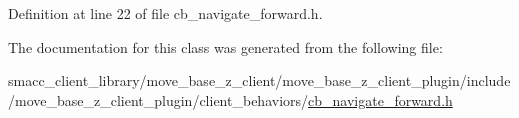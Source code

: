 Definition at line 22 of file cb\+\_\+navigate\+\_\+forward.\+h.



The documentation for this class was generated from the following file\+:\begin{DoxyCompactItemize}
\item 
smacc\+\_\+client\+\_\+library/move\+\_\+base\+\_\+z\+\_\+client/move\+\_\+base\+\_\+z\+\_\+client\+\_\+plugin/include/move\+\_\+base\+\_\+z\+\_\+client\+\_\+plugin/client\+\_\+behaviors/\hyperlink{smacc__client__library_2move__base__z__client_2move__base__z__client__plugin_2include_2move__bas3f31d4d52bbf09e30133b849422d4b0f}{cb\+\_\+navigate\+\_\+forward.\+h}\end{DoxyCompactItemize}
